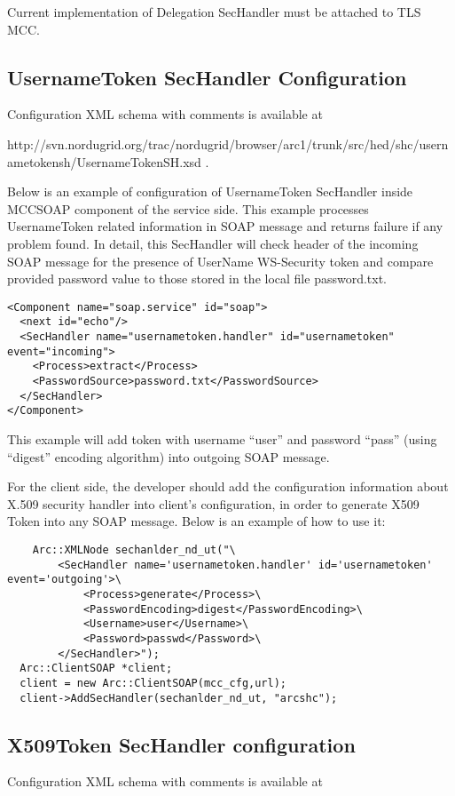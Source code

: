 \documentclass{book}
\begin{document}
Current implementation of Delegation SecHandler must be attached to TLS MCC. 


\subsection{UsernameToken SecHandler Configuration} %
\label{subsec:ut_sechandler_conf}
Configuration XML schema with comments is available at 

http://svn.nordugrid.org/trac/nordugrid/browser/arc1/trunk/src/hed/shc/usernametokensh/UsernameTokenSH.xsd .

Below is an example of configuration of UsernameToken SecHandler inside MCCSOAP component of the service side. This example processes UsernameToken related information in SOAP message and returns failure if any problem found. In detail, this SecHandler will check header of the incoming SOAP message for the presence of UserName WS-Security token and compare provided password value to those stored in the local file password.txt.

\begin{verbatim}
<Component name="soap.service" id="soap">
  <next id="echo"/>
  <SecHandler name="usernametoken.handler" id="usernametoken" event="incoming">
    <Process>extract</Process>
    <PasswordSource>password.txt</PasswordSource>
  </SecHandler>
</Component>
\end{verbatim}

This example will add token with username ``user'' and password ``pass'' (using ``digest'' encoding algorithm) into outgoing SOAP message.

For the client side, the developer should add the configuration information about X.509 security handler into client's configuration, in order to generate X509 Token into any SOAP message. Below is an example of how to use it:

\begin{verbatim}
    Arc::XMLNode sechanlder_nd_ut("\ 
        <SecHandler name='usernametoken.handler' id='usernametoken' event='outgoing'>\ 
            <Process>generate</Process>\ 
            <PasswordEncoding>digest</PasswordEncoding>\ 
            <Username>user</Username>\ 
            <Password>passwd</Password>\ 
        </SecHandler>"); 
  Arc::ClientSOAP *client; 
  client = new Arc::ClientSOAP(mcc_cfg,url); 
  client->AddSecHandler(sechanlder_nd_ut, "arcshc");
\end{verbatim}

\subsection{X509Token SecHandler configuration} %
\label{subsec:xt_sechandler_conf}
Configuration XML schema with comments is available at 
\end{document}

